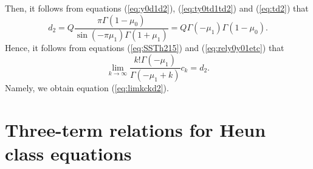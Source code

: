 \documentclass[12pt]{amsart}
\numberwithin{equation}{section}
\theoremstyle{definition}
\theoremstyle{remark}
\begin{document}
Then, it follows from equations (\ref{eq:y0d1d2}), (\ref{eq:ty0td1td2}) and (\ref{eq:td2}) that 
\begin{equation}
d_2 =  Q \frac{\pi  \Gamma (1-\mu _0 )}{\sin (-\pi \mu _1 ) \Gamma (1+\mu _1 )}  =  Q  \Gamma (- \mu _1 ) \Gamma (1-\mu _0 ) .
\end{equation}
Hence, it follows from equations (\ref{eq:SSTh215}) and (\ref{eq:rely0y01etc}) that
\begin{equation}
\lim _{k \to \infty} \frac{ k!\Gamma (- \mu _1 )  }{ \Gamma (-\mu _1 +k )} c_k = d_2 .
\end{equation}
Namely, we obtain equation (\ref{eq:limkckd2}).

\section{Three-term relations for Heun class equations} \label{sec:TTR}
\end{document}
